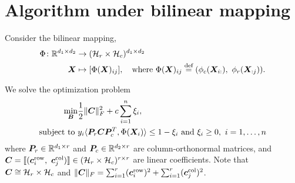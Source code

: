 \documentclass[11pt]{article}
\theoremstyle{plain}
\theoremstyle{definition}
\begin{document}
\section{Algorithm under bilinear mapping}
Consider the bilinear mapping,
\begin{align}
\Phi\colon \mathbb{R}^{d_1\times d_2}& \to (\tH_r\times \tH_c)^{d_1\times d_2}\\
\mX& \mapsto [\Phi(\mX)_{ij}],\quad \text{where}\ \Phi(\mX)_{ij}\stackrel{\text{def}}{=}(\phi_c(\mX_{i:}),\ \phi_r(\mX_{:j})).
\end{align}

We solve the optimization problem
\begin{align}\label{eq:opt}
\min_{\bm B}&{1\over 2}\lVert\bm C\rVert_F^2 + c\sum_{i=1}^ n \xi_i,\\
\text{subject to }&y_i\langle \bm{P}_r\bm C\bm{P}_c^T, \Phi(\bm X_i)\rangle \leq 1-\xi_i \text{ and}\ \xi_i\geq 0,\ i=1,\ldots,n
\end{align}
where $\bm{P}_r\in\mathbb{R}^{d_1\times r}$ and $\bm{P}_c\in\mathbb{R}^{d_2\times r}$ are column-orthonormal matrices,  and $\mC=\entry{(\mc^{\text{row}}_i,\ \mc^{\text{col}}_j)} \in (\tH_r\times \tH_c)^{r\times r}$ are linear coefficients. Note that $\bm C \cong \mathcal{H}_r \times \mathcal{H}_c$ and $\lVert\bm C\rVert_F=\sum_{i=1}^r (\bm{c}^{\text{row}}_i)^2+\sum_{i=1}^r (\bm{c}^{\text{col}}_j)^2$.
\end{document}

